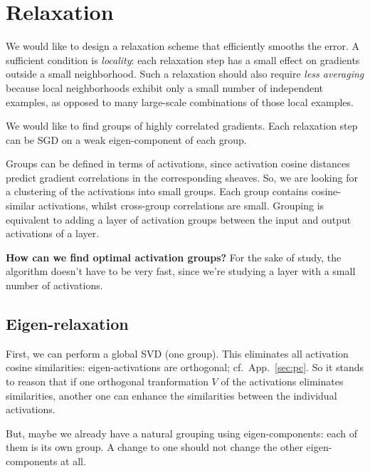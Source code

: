 \documentclass[11pt]{article}
\begin{document}
\section{Relaxation}
\label{sec:relax}
We would like to design a relaxation scheme that efficiently smooths the error. A sufficient condition is {\it locality}: each relaxation step has a small effect on gradients outside a small neighborhood. Such a relaxation should also require {\it less averaging} because local neighborhoods exhibit only a small number of independent examples, as opposed to many large-scale combinations of those local examples.

We would like to find groups of highly correlated gradients. Each relaxation step can be SGD on a weak eigen-component of each group.

Groups can be defined in terms of activations, since activation cosine distances predict gradient correlations in the corresponding sheaves. So, we are looking for a clustering of the activations into small groups. Each group contains cosine-similar activations, whilst cross-group correlations are small. Grouping is equivalent to adding a layer of activation groups between the input and output activations of a layer.

{\bf How can we find optimal activation groups?} For the sake of study, the algorithm doesn't have to be very fast, since we're studying a layer with a small number of activations.

\subsection{Eigen-relaxation}
\label{sec:eigenrelax}
First, we can perform a global SVD (one group). This eliminates all activation cosine similarities: eigen-activations are orthogonal; cf.~App.~\ref{sec:pc}. So it stands to reason that if one orthogonal tranformation $V$ of the activations eliminates similarities, another one can enhance the similarities between the individual activations.

But, maybe we already have a natural grouping using eigen-components: each of them is its own group. A change to one should not change the other eigen-components at all.
\end{document}

